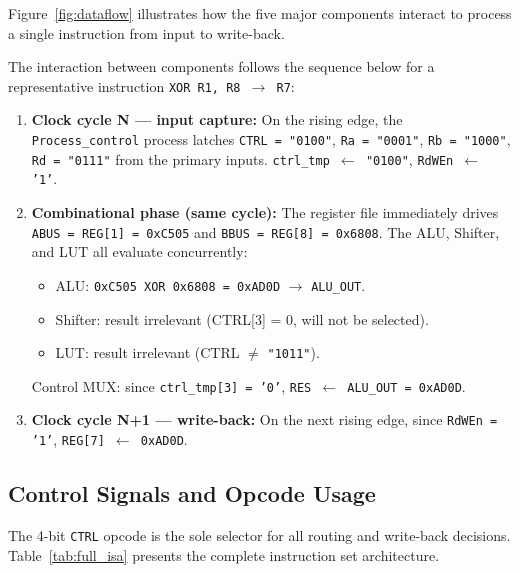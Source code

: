 \documentclass[12pt, a4paper]{report}
\begin{document}
Figure~\ref{fig:dataflow} illustrates how the five major components interact
to process a single instruction from input to write-back.




The interaction between components follows the sequence below for a representative
instruction \texttt{XOR R1, R8 $\rightarrow$ R7}:

\begin{enumerate}
  \item \textbf{Clock cycle N — input capture:}
        On the rising edge, the \texttt{Process\_control} process latches
        \texttt{CTRL = "0100"}, \texttt{Ra = "0001"}, \texttt{Rb = "1000"},
        \texttt{Rd = "0111"} from the primary inputs.
        \texttt{ctrl\_tmp $\leftarrow$ "0100"}, \texttt{RdWEn $\leftarrow$ '1'}.

  \item \textbf{Combinational phase (same cycle):}
        The register file immediately drives
        \texttt{ABUS = REG[1] = 0xC505} and \texttt{BBUS = REG[8] = 0x6808}.
        The ALU, Shifter, and LUT all evaluate concurrently:
        \begin{itemize}
          \item ALU: \texttt{0xC505 XOR 0x6808 = 0xAD0D} $\rightarrow$ \texttt{ALU\_OUT}.
          \item Shifter: result irrelevant (CTRL[3] = 0, will not be selected).
          \item LUT: result irrelevant (CTRL $\neq$ \texttt{"1011"}).
        \end{itemize}
        Control MUX: since \texttt{ctrl\_tmp[3] = '0'}, \texttt{RES $\leftarrow$ ALU\_OUT = 0xAD0D}.

  \item \textbf{Clock cycle N+1 — write-back:}
        On the next rising edge, since \texttt{RdWEn = '1'},
        \texttt{REG[7] $\leftarrow$ 0xAD0D}.
\end{enumerate}

\subsection{Control Signals and Opcode Usage}

The 4-bit \texttt{CTRL} opcode is the sole selector for all routing and write-back
decisions. Table~\ref{tab:full_isa} presents the complete instruction set architecture.
\end{document}
